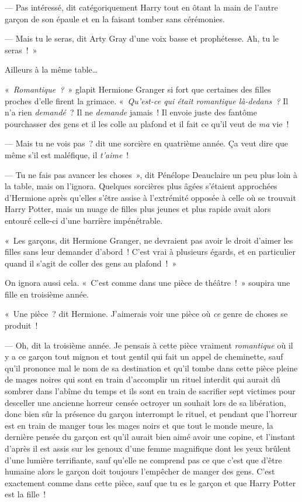 --- Pas intéressé, dit catégoriquement Harry tout en ôtant la main de l'autre garçon de son épaule et en la faisant tomber sans cérémonies.

--- Mais tu le seras, dit Arty Gray d'une voix basse et prophétesse. Ah, tu le seras~!~»

Ailleurs à la même table…

«~\emph{Romantique~?}~» glapit Hermione Granger si fort que certaines des filles proches d'elle firent la grimace. «~\emph{Qu'est-ce qui était romantique là-dedans~?} Il n'a rien \emph{demandé}~? Il ne \emph{demande} jamais~! Il envoie juste des fantôme pourchasser des gens et il les colle au plafond et il fait ce qu'il veut de \emph{ma} vie~!

--- Mais tu ne vois pas~? dit une sorcière en quatrième année. Ça veut dire que même s'il est maléfique, il \emph{t'aime}~!

--- Tu ne fais pas avancer les choses~», dit Pénélope Deauclaire un peu plus loin à la table, mais on l'ignora. Quelques sorcières plus âgées s'étaient approchées d'Hermione après qu'elles s'être assise à l'extrémité opposée à celle où se trouvait Harry Potter, mais un nuage de filles plus jeunes et plus rapide avait alors entouré celle-ci d'une barrière impénétrable.

«~Les garçons, dit Hermione Granger, ne devraient pas avoir le droit d'aimer les filles sans leur demander d'abord~! C'est vrai à plusieurs égards, et en particulier quand il s'agit de coller des gens au plafond~!~»

On ignora aussi cela. «~C'est comme dans une pièce de théâtre~!~» soupira une fille en troisième année.

«~Une pièce~? dit Hermione. J'aimerais voir une pièce où \emph{ce} genre de choses se produit~!

--- Oh, dit la troisième année. Je pensais à cette pièce vraiment \emph{romantique} où il y a ce garçon tout mignon et tout gentil qui fait un appel de cheminette, sauf qu'il prononce mal le nom de sa destination et qu'il tombe dans cette pièce pleine de mages noires qui sont en train d'accomplir un rituel interdit qui aurait dû sombrer dans l'abîme du temps et ils sont en train de sacrifier sept victimes pour desceller une ancienne horreur censée octroyer un souhait lors de sa libération, donc bien sûr la présence du garçon interrompt le rituel, et pendant que l'horreur est en train de manger tous les mages noirs et que tout le monde meure, la dernière pensée du garçon est qu'il aurait bien aimé avoir une copine, et l'instant d'après il est assis sur les genoux d'une femme magnifique dont les yeux brûlent d'une lumière terrifiante, sauf qu'elle ne comprend pas ce que c'est que d'être humaine alors le garçon doit toujours l'empêcher de manger des gens. C'est exactement comme dans cette pièce, sauf que tu es le garçon et que Harry Potter est la fille~!

